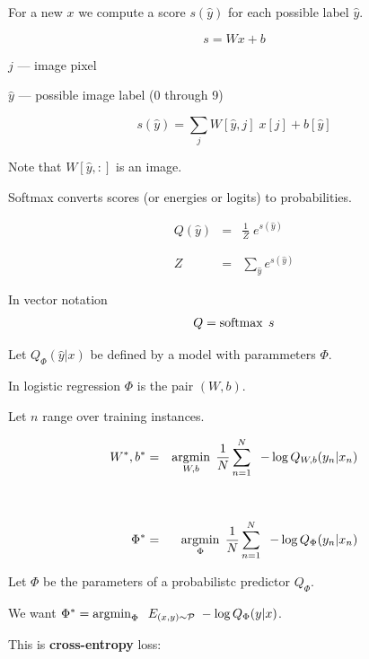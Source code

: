 {\vfill
For a new $x$ we compute a score $s(\hat{y})$ for each possible label $\hat{y}$.

\vfill
$$s = Wx + b$$


$j$ --- image pixel

\vfill
$\hat{y}$ --- possible image label (0 through 9)

\vfill
$$s(\hat{y}) = \sum_j W[\hat{y},j]\; x[j] + b[\hat{y}]$$

\vfill
Note that $W[\hat{y},:]$ is an image.


Softmax converts scores (or energies or logits) to probabilities.

\vfill
\begin{eqnarray*}
  Q(\hat{y}) & = & \frac{1}{Z}\; e^{s(\hat{y})}
  \\
  \\
  \\
  Z & = & \sum_{\hat{y}} e^{s(\hat{y})}
\end{eqnarray*}

\vfill
In vector notation
\bigskip
$$Q  = \operatorname*{softmax}\; s$$

Let $Q_\Phi(\hat{y}|x)$ be defined by a model with parammeters $\Phi$.

\vfill
In logistic regression $\Phi$ is the pair $(W,b)$.

\vfill
Let $n$ range over training instances.

\begin{eqnarray*}
  W^*, b^* & = & \operatorname*{argmin}_{W,b}\; \frac{1}{N} \sum_{n = 1}^N\;\;- \log Q_{W,b}(y_n|x_n) \\
  \\
  \\
  \Phi^* & = & \operatorname*{argmin}_\Phi \;\frac{1}{N} \sum_{n = 1}^N\;\;- \log Q_\Phi(y_n|x_n) \\
\end{eqnarray*}



Let $\Phi$ be the parameters of a probabilistc predictor $Q_\Phi$.

\vfill
\vfill
\centerline{We want \hspace{3ex} $\Phi^* = \operatorname*{argmin}_\Phi \;\;E_{(x,y) \sim {\cal P}}\; -\log Q_\Phi(y|x)$.}

\vfill
\vfill
\vfill
This is {\bf cross-entropy} loss:

}
